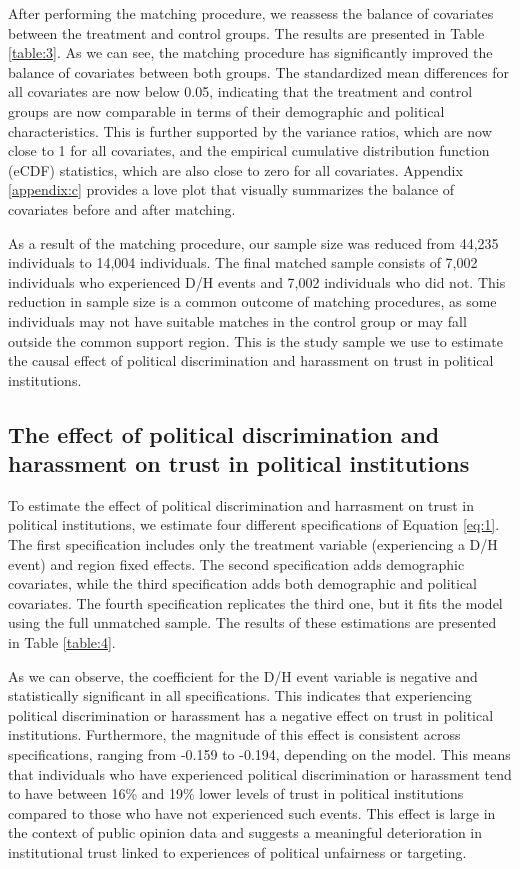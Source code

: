 \documentclass{article}
\begin{document}
After performing the matching procedure, we reassess the balance of covariates between the treatment and control groups. The results are presented in Table \ref{table:3}. As we can see, the matching procedure has significantly improved the balance of covariates between both groups. The standardized mean differences for all covariates are now below 0.05, indicating that the treatment and control groups are now comparable in terms of their demographic and political characteristics. This is further supported by the variance ratios, which are now close to 1 for all covariates, and the empirical cumulative distribution function (eCDF) statistics, which are also close to zero for all covariates. Appendix \ref{appendix:c} provides a love plot that visually summarizes the balance of covariates before and after matching.



As a result of the matching procedure, our sample size was reduced from 44,235 individuals to 14,004 individuals. The final matched sample consists of 7,002 individuals who experienced D/H events and 7,002 individuals who did not. This reduction in sample size is a common outcome of matching procedures, as some individuals may not have suitable matches in the control group or may fall outside the common support region. This is the study sample we use to estimate the causal effect of political discrimination and harassment on trust in political institutions.

\subsection{The effect of political discrimination and harassment on trust in political institutions}

To estimate the effect of political discrimination and harrasment on trust in political institutions, we estimate four different specifications of Equation \ref{eq:1}. The first specification includes only the treatment variable (experiencing a D/H event) and region fixed effects. The second specification adds demographic covariates, while the third specification adds both demographic and political covariates. The fourth specification replicates the third one, but it fits the model using the full unmatched sample. The results of these estimations are presented in Table \ref{table:4}.



As we can observe, the coefficient for the D/H event variable is negative and statistically significant in all specifications. This indicates that experiencing political discrimination or harassment has a negative effect on trust in political institutions. Furthermore, the magnitude of this effect is consistent across specifications, ranging from -0.159 to -0.194, depending on the model. This means that individuals who have experienced political discrimination or harassment tend to have between 16\% and 19\% lower levels of trust in political institutions compared to those who have not experienced such events. This effect is large in the context of public opinion data and suggests a meaningful deterioration in institutional trust linked to experiences of political unfairness or targeting.
\end{document}
